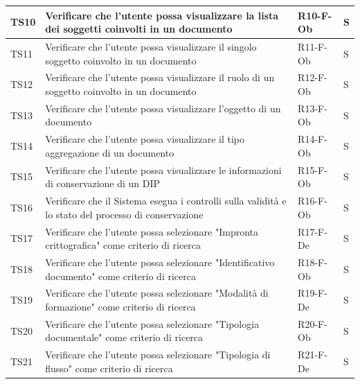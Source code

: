 \documentclass[a4paper,12pt]{article}
\begin{document}
\begin{longtable}{|M{1.2cm}|M{6.3cm}|M{2.5cm}|M{1.5cm}|}
                TS10 & Verificare che l’utente possa visualizzare la lista dei soggetti coinvolti in un documento & R10-F-Ob & S \\
                \hline

                TS11 & Verificare che l’utente possa visualizzare il singolo soggetto coinvolto in un documento & R11-F-Ob & S \\
                \hline

                TS12 & Verificare che l’utente possa visualizzare il ruolo di un soggetto coinvolto in un documento & R12-F-Ob & S \\
                \hline

                TS13 & Verificare che l'utente possa visualizzare l’oggetto di un documento & R13-F-Ob & S \\
                \hline

                TS14 & Verificare che l'utente possa visualizzare il tipo aggregazione di un documento & R14-F-Ob & S \\
                \hline

                TS15 & Verificare che l'utente possa visualizzare le informazioni di conservazione di un DIP & R15-F-Ob & S \\
                \hline

                TS16 & Verificare che il Sistema esegua i controlli sulla validità e lo stato del processo di conservazione & R16-F-Ob & S \\
                \hline

                TS17 & Verificare che l'utente possa selezionare "Impronta crittografica" come criterio di ricerca & R17-F-De & S \\
                \hline

                TS18 & Verificare che l'utente possa selezionare "Identificativo documento" come criterio di ricerca & R18-F-Ob & S \\
                \hline

                TS19 & Verificare che l'utente possa selezionare "Modalità di formazione" come criterio di ricerca & R19-F-De & S \\
                \hline

                TS20 & Verificare che l'utente possa selezionare "Tipologia documentale" come criterio di ricerca & R20-F-Ob & S \\
                \hline

                TS21 & Verificare che l'utente possa selezionare "Tipologia di flusso" come criterio di ricerca & R21-F-De & S \\
                \hline


\end{longtable}
\end{document}
